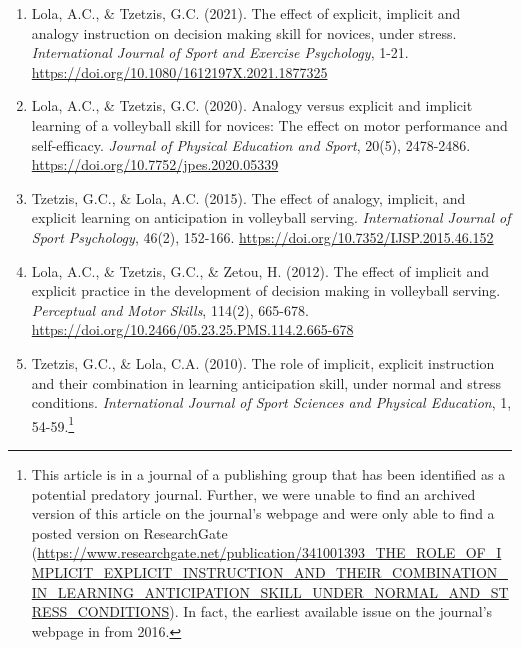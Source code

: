 \documentclass[
  english,
  man,floatsintext]{apa7}
\begin{document}
\begin{enumerate}
\def\labelenumi{\arabic{enumi}.}
\item
  Lola, A.C., \& Tzetzis, G.C. (2021). The effect of explicit, implicit and analogy instruction on decision making skill for novices, under stress. \emph{International Journal of Sport and Exercise Psychology}, 1-21. \url{https://doi.org/10.1080/1612197X.2021.1877325}
\item
  Lola, A.C., \& Tzetzis, G.C. (2020). Analogy versus explicit and implicit learning of a volleyball skill for novices: The effect on motor performance and self-efficacy. \emph{Journal of Physical Education and Sport}, 20(5), 2478-2486. \url{https://doi.org/10.7752/jpes.2020.05339}
\item
  Tzetzis, G.C., \& Lola, A.C. (2015). The effect of analogy, implicit, and explicit learning on anticipation in volleyball serving. \emph{International Journal of Sport Psychology}, 46(2), 152-166. \url{https://doi.org/10.7352/IJSP.2015.46.152}
\item
  Lola, A.C., \& Tzetzis, G.C., \& Zetou, H. (2012). The effect of implicit and explicit practice in the development of decision making in volleyball serving. \emph{Perceptual and Motor Skills}, 114(2), 665-678. \url{https://doi.org/10.2466/05.23.25.PMS.114.2.665-678}
\item
  Tzetzis, G.C., \& Lola, C.A. (2010). The role of implicit, explicit instruction and their combination in learning anticipation skill, under normal and stress conditions. \emph{International Journal of Sport Sciences and Physical Education}, 1, 54-59.\footnote{This article is in a journal of a publishing group that has been identified as a potential predatory journal. Further, we were unable to find an archived version of this article on the journal's webpage and were only able to find a posted version on ResearchGate (\url{https://www.researchgate.net/publication/341001393_THE_ROLE_OF_IMPLICIT_EXPLICIT_INSTRUCTION_AND_THEIR_COMBINATION_IN_LEARNING_ANTICIPATION_SKILL_UNDER_NORMAL_AND_STRESS_CONDITIONS}). In fact, the earliest available issue on the journal's webpage in from 2016.}
\end{enumerate}
\end{document}
